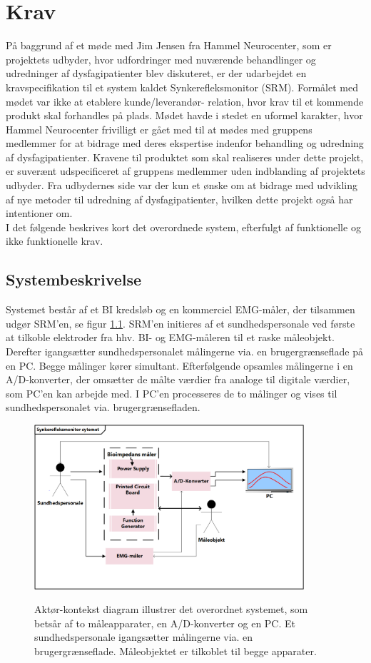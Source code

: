 \chapter{Krav}

På baggrund af et møde med Jim Jensen fra Hammel Neurocenter, som er projektets udbyder, hvor udfordringer med nuværende behandlinger og udredninger af dysfagipatienter blev diskuteret, er der udarbejdet en kravspecifikation til et system kaldet Synkerefleksmonitor (SRM). Formålet med mødet var ikke at etablere kunde/leverandør- relation, hvor krav til et kommende produkt skal forhandles på plads. Mødet havde i stedet en uformel karakter, hvor Hammel Neurocenter frivilligt er gået med til at mødes med gruppens medlemmer for at bidrage med deres ekspertise indenfor behandling og udredning af dysfagipatienter. Kravene til produktet som skal realiseres under dette projekt, er suverænt udspecificeret af gruppens medlemmer uden indblanding af projektets udbyder. Fra udbydernes side var der kun et ønske om at bidrage med udvikling af nye metoder til udredning af dysfagipatienter, hvilken dette projekt også har intentioner om. \\

I det følgende beskrives kort det overordnede system, efterfulgt af funktionelle og ikke funktionelle krav.  

\section{Systembeskrivelse}
Systemet består af et BI kredsløb og en kommerciel EMG-måler, der tilsammen udgør SRM'en, se figur \ref{fig:sysbeskrivelse}. SRM'en initieres af et sundhedspersonale ved første at tilkoble elektroder fra hhv. BI- og EMG-måleren til et raske måleobjekt. Derefter igangsætter sundhedspersonalet målingerne via. en brugergrænseflade på en PC. Begge målinger kører simultant. Efterfølgende opsamles målingerne i en A/D-konverter, der omsætter de målte værdier fra analoge til digitale værdier, som PC'en kan arbejde med. I PC'en processeres de to målinger og vises til sundhedspersonalet via. brugergrænsefladen.   

\begin{figure}[H]
\centering
{\includegraphics[width=10cm]
{Figure/AktoerKontextDiagram}}
\caption{Aktør-kontekst diagram illustrer det overordnet systemet, som betsår af to måleapparater, en A/D-konverter og en PC. Et sundhedspersonale igangsætter målingerne via. en brugergrænseflade. Måleobjektet er tilkoblet til begge apparater. }
\label{fig:sysbeskrivelse}
\end{figure}  

